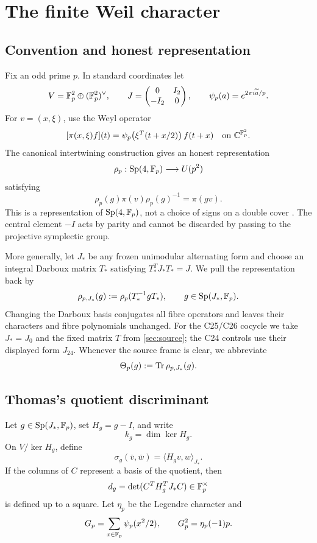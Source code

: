 \section{The finite Weil character}
\label{sec:weil}

\subsection{Convention and honest representation}

Fix an odd prime \(p\).  In standard coordinates let
\[
V=\mathbb{F}_p^2\oplus(\mathbb{F}_p^2)^\vee,
\qquad
J=\begin{pmatrix}0&I_2\\-I_2&0\end{pmatrix},
\qquad
\psi_p(a)=e^{2\pi i\widetilde a/p}.
\]
For \(v=(x,\xi)\), use the Weyl operator
\[
[\pi(x,\xi)f](t)
=\psi_p\!\left(\xi^T(t+x/2)\right)f(t+x)
\quad\text{on }\mathbb{C}^{\mathbb{F}_p^2}.
\]
The canonical intertwining construction gives an honest representation
\[
\rho_p:\operatorname{Sp}(4,\mathbb{F}_p)\longrightarrow U(p^2)
\]
satisfying
\[
\rho_p(g)\pi(v)\rho_p(g)^{-1}=\pi(gv).
\]
This is a representation of \(\operatorname{Sp}(4,\mathbb{F}_p)\), not a choice of signs on a
double cover \citep{gurevich2009}.  The central element \(-I\) acts by
parity and cannot be discarded by passing to the projective symplectic group.

More generally, let \(J_*\) be any frozen unimodular alternating form and
choose an integral Darboux matrix \(T_*\) satisfying
\(T_*^T J_*T_*=J\).  We pull the representation back by
\begin{equation}
\rho_{p,J_*}(g):=\rho_p(T_*^{-1}gT_*),
\qquad g\in\operatorname{Sp}(J_*,\mathbb{F}_p).
\label{eq:rho-pullback}
\end{equation}
Changing the Darboux basis conjugates all fibre operators and leaves their
characters and fibre polynomials unchanged.  For the C25/C26 cocycle we take
\(J_*=J_0\) and the fixed matrix \(T\) from \cref{sec:source}; the C24
controls use their displayed form \(J_{24}\).  Whenever the source frame is
clear, we abbreviate
\[
\Theta_p(g):=\operatorname{Tr}\rho_{p,J_*}(g).
\]

\subsection{Thomas's quotient discriminant}

Let \(g\in\operatorname{Sp}(J_*,\mathbb{F}_p)\), set \(H_g=g-I\), and write
\[
k_g=\dim\ker H_g.
\]
On \(V/\ker H_g\), define
\[
\sigma_g(\bar v,\bar w)
=\langle H_gv,w\rangle_{J_*}.
\]
If the columns of \(C\) represent a basis of the quotient, then
\[
d_g=\det(C^TH_g^TJ_*C)\in\mathbb{F}_p^\times
\]
is defined up to a square.  Let \(\eta_p\) be the Legendre character and
\[
G_p=\sum_{x\in\mathbb{F}_p}\psi_p(x^2/2),
\qquad G_p^2=\eta_p(-1)p.
\]

